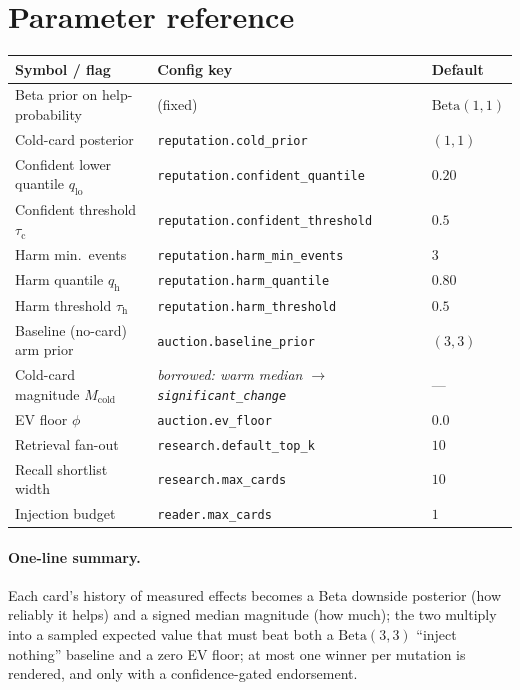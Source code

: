 \documentclass[11pt]{article}
\newcommand{\code}[1]{\texttt{\small #1}}
\newcommand{\Beta}{\mathrm{Beta}}
\begin{document}
\section{Parameter reference}

\begin{center}
\begin{longtable}{@{}lll@{}}
\toprule
Symbol / flag & Config key & Default \\
\midrule
\endhead
Beta prior on help-probability & (fixed) & $\Beta(1,1)$ \\
Cold-card posterior            & \code{reputation.cold\_prior}       & $(1,1)$ \\
Confident lower quantile $q_{\text{lo}}$ & \code{reputation.confident\_quantile} & $0.20$ \\
Confident threshold $\tau_{\text{c}}$    & \code{reputation.confident\_threshold} & $0.5$ \\
Harm min.\ events              & \code{reputation.harm\_min\_events} & $3$ \\
Harm quantile $q_{\text{h}}$   & \code{reputation.harm\_quantile}    & $0.80$ \\
Harm threshold $\tau_{\text{h}}$ & \code{reputation.harm\_threshold} & $0.5$ \\
Baseline (no-card) arm prior   & \code{auction.baseline\_prior}      & $(3,3)$ \\
Cold-card magnitude $M_{\text{cold}}$ & \emph{borrowed: warm median $\to$ \code{significant\_change}} & --- \\
EV floor $\phi$                & \code{auction.ev\_floor}            & $0.0$ \\
Retrieval fan-out              & \code{research.default\_top\_k}     & $10$ \\
Recall shortlist width         & \code{research.max\_cards}          & $10$ \\
Injection budget               & \code{reader.max\_cards}            & $1$ \\
\bottomrule
\end{longtable}
\end{center}

\paragraph{One-line summary.} Each card's history of measured effects becomes a
Beta downside posterior (how reliably it helps) and a signed median magnitude (how
much); the two multiply into a sampled expected value that must beat both a
$\Beta(3,3)$ ``inject nothing'' baseline and a zero EV floor; at most one winner
per mutation is rendered, and only with a confidence-gated endorsement.
\end{document}
